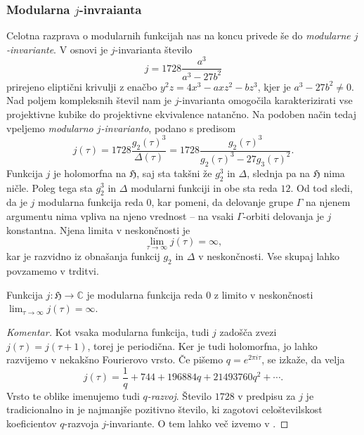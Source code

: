 \documentclass[mat1]{fmfdelo}
\numberwithin{equation}{section}
\newcommand{\C}{\mathbb C}
\newcommand{\HH}{\mathfrak{H}}
\newcommand{\SL}{\Gamma}
\theoremstyle{definition}
\newenvironment{komentar}[1][Komentar]{\begin{proof}[#1]\let\qed\relax}{\end{proof}}
\begin{document}
\subsubsection*{Modularna $j$-invraianta} Celotna razprava o modularnih funkcijah nas na koncu privede še do \emph{modularne $j$-invariante}. V osnovi je $j$-invarianta število 
\[
    j = 1728\frac{a^3}{a^3 - 27b^2}
\]
prirejeno eliptični krivulji z enačbo $y^2z = 4x^3 - axz^2 - bz^3$, kjer je $a^3 - 27b^2 \neq 0$. Nad poljem kompleksnih števil nam je $j$-invarianta omogočila karakterizirati vse projektivne kubike do projektivne ekvivalence natančno. Na podoben način tedaj vpeljemo \emph{modularno $j$-invarianto}, podano s predisom
\[
    j(\tau) = 1728\frac{g_2(\tau)^3}{\Delta(\tau)}
    = 1728\frac{g_2(\tau)^3}{g_2(\tau)^3 - 27g_3(\tau)^2}.
\]
Funkcija $j$ je holomorfna na $\HH$, saj sta takšni že $g_2^3$ in $\Delta$, slednja pa na $\HH$ nima ničle. Poleg tega sta $g_2^3$ in $\Delta$ modularni funkciji in obe sta reda $12$. Od tod sledi, da je $j$ modularna funkcija reda $0$, kar pomeni, da delovanje grupe $\SL$ na njenem argumentu nima vpliva na njeno vrednost -- na vsaki $\SL$-orbiti delovanja je $j$ konstantna. Njena limita v neskončnosti je 
\[
    \lim_{\tau \to \infty}j(\tau) = \infty,
\]
kar je razvidno iz obnašanja funkcij $g_2$ in $\Delta$ v neskončnosti. Vse skupaj lahko povzamemo v trditvi.

\begin{trditev}
    Funkcija $j : \HH \to \C$ je modularna funkcija reda $0$ z limito v neskončnosti $\lim_{\tau \to \infty}j(\tau) = \infty$.
\end{trditev}

\begin{komentar}
    Kot vsaka modularna funkcija, tudi $j$ zadošča zvezi $j(\tau) = j(\tau + 1)$, torej je periodična. Ker je tudi holomorfna, jo lahko razvijemo v nekakšno Fourierovo vrsto. Če pišemo $q = e^{2\pi i \tau}$, se izkaže, da velja
    \[
        j(\tau) = \frac{1}{q} + 744 + 196884q + 21493760q^2 + \cdots.
    \]
    Vrsto te oblike imenujemo tudi \emph{$q$-razvoj}. Število $1728$ v predpisu za $j$ je tradicionalno in je najmanjše pozitivno število, ki zagotovi celoštevilskost koeficientov $q$-razvoja $j$-invariante. O tem lahko več izvemo v \cite[VII, \S3]{Serre}.
\end{komentar}

\end{document}
